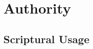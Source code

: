 \section{Authority}
	\label{AUTHORITY}
	





\subsection{Scriptural Usage} %
	\label{AUTHORITY-SCRIPTURES}

	
	
